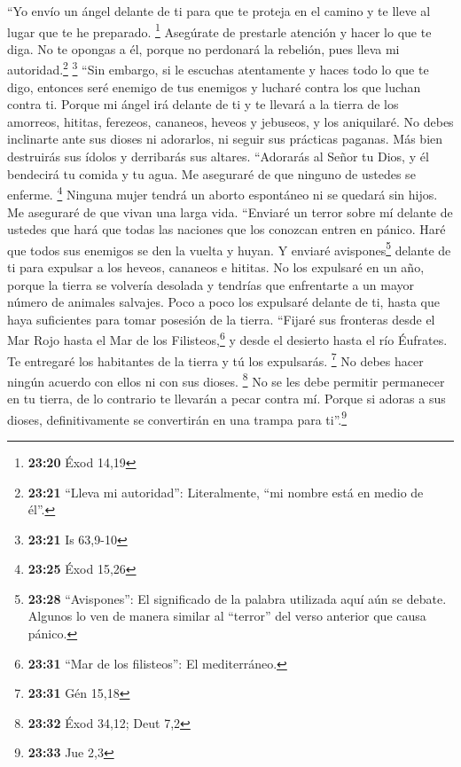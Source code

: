  ``Yo envío un ángel delante de ti para que te proteja en
el camino y te lleve al lugar que te he preparado. \footnote{\textbf{23:20}
  Éxod 14,19}  Asegúrate de prestarle atención y hacer lo
que te diga. No te opongas a él, porque no perdonará la rebelión, pues
lleva mi autoridad.\footnote{\textbf{23:21} ``Lleva mi autoridad'':
  Literalmente, ``mi nombre está en medio de él''.} \footnote{\textbf{23:21}
  Is 63,9-10}  ``Sin embargo, si le escuchas atentamente
y haces todo lo que te digo, entonces seré enemigo de tus enemigos y
lucharé contra los que luchan contra ti.  Porque mi ángel
irá delante de ti y te llevará a la tierra de los amorreos, hititas,
ferezeos, cananeos, heveos y jebuseos, y los aniquilaré. 
No debes inclinarte ante sus dioses ni adorarlos, ni seguir sus
prácticas paganas. Más bien destruirás sus ídolos y derribarás sus
altares.  ``Adorarás al Señor tu Dios, y él bendecirá tu
comida y tu agua. Me aseguraré de que ninguno de ustedes se enferme.
\footnote{\textbf{23:25} Éxod 15,26}  Ninguna mujer
tendrá un aborto espontáneo ni se quedará sin hijos. Me aseguraré de que
vivan una larga vida.  ``Enviaré un terror sobre mí
delante de ustedes que hará que todas las naciones que los conozcan
entren en pánico. Haré que todos sus enemigos se den la vuelta y huyan.
 Y enviaré avispones\footnote{\textbf{23:28}
  ``Avispones'': El significado de la palabra utilizada aquí aún se
  debate. Algunos lo ven de manera similar al ``terror'' del verso
  anterior que causa pánico.} delante de ti para expulsar a los heveos,
cananeos e hititas.  No los expulsaré en un año, porque
la tierra se volvería desolada y tendrías que enfrentarte a un mayor
número de animales salvajes.  Poco a poco los expulsaré
delante de ti, hasta que haya suficientes para tomar posesión de la
tierra.  ``Fijaré sus fronteras desde el Mar Rojo hasta
el Mar de los Filisteos,\footnote{\textbf{23:31} ``Mar de los
  filisteos'': El mediterráneo.} y desde el desierto hasta el río
Éufrates. Te entregaré los habitantes de la tierra y tú los expulsarás.
\footnote{\textbf{23:31} Gén 15,18}  No debes hacer
ningún acuerdo con ellos ni con sus dioses. \footnote{\textbf{23:32}
  Éxod 34,12; Deut 7,2}  No se les debe permitir
permanecer en tu tierra, de lo contrario te llevarán a pecar contra mí.
Porque si adoras a sus dioses, definitivamente se convertirán en una
trampa para ti''.\footnote{\textbf{23:33} Jue 2,3}

